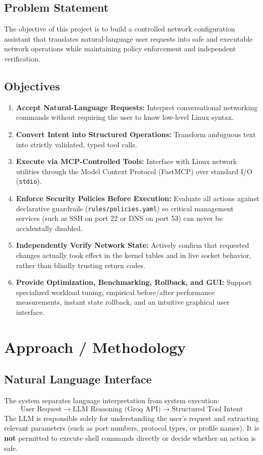 \documentclass[11pt,a4paper]{article}
\begin{document}
\subsection{Problem Statement}
The objective of this project is to build a controlled network configuration assistant that translates natural-language user requests into safe and executable network operations while maintaining policy enforcement and independent verification.

\subsection{Objectives}
\begin{enumerate}
    \item \textbf{Accept Natural-Language Requests:} Interpret conversational networking commands without requiring the user to know low-level Linux syntax.
    \item \textbf{Convert Intent into Structured Operations:} Transform ambiguous text into strictly validated, typed tool calls.
    \item \textbf{Execute via MCP-Controlled Tools:} Interface with Linux network utilities through the Model Context Protocol (FastMCP) over standard I/O (\texttt{stdio}).
    \item \textbf{Enforce Security Policies Before Execution:} Evaluate all actions against declarative guardrails (\texttt{rules/policies.yaml}) so critical management services (such as SSH on port 22 or DNS on port 53) can never be accidentally disabled.
    \item \textbf{Independently Verify Network State:} Actively confirm that requested changes actually took effect in the kernel tables and in live socket behavior, rather than blindly trusting return codes.
    \item \textbf{Provide Optimization, Benchmarking, Rollback, and GUI:} Support specialized workload tuning, empirical before/after performance measurements, instant state rollback, and an intuitive graphical user interface.
\end{enumerate}

\section{Approach / Methodology}

\subsection{Natural Language Interface}
The system separates language interpretation from system execution:
\[
\text{User Request} \longrightarrow \text{LLM Reasoning (Groq API)} \longrightarrow \text{Structured Tool Intent}
\]
The LLM is responsible solely for understanding the user's request and extracting relevant parameters (such as port numbers, protocol types, or profile names). It is \textbf{not} permitted to execute shell commands directly or decide whether an action is safe.
\end{document}
